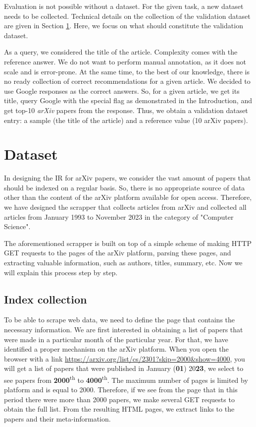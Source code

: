 \documentclass{article}
\begin{document}
        Evaluation is not possible without a dataset. For the given task, a new dataset needs to be collected. Technical details on the collection of the validation dataset are given in Section \ref{sec:dataset}. Here, we focus on what should constitute the validation dataset.

        As a query, we considered the title of the article. Complexity comes with the reference answer. We do not want to perform manual annotation, as it does not scale and is error-prone. At the same time, to the best of our knowledge, there is no ready collection of correct recommendations for a given article. We decided to use Google responses as the correct answers. So, for a given article, we get its title, query Google with the special flag as demonstrated in the Introduction, and get top-10 \textit{arXiv} papers from the response. Thus, we obtain a validation dataset entry: a sample (the title of the article) and a reference value (10 arXiv papers). 

\section{Dataset}\label{sec:dataset}
    
    In designing the IR for arXiv papers, we consider the vast amount of papers that should be indexed on a regular basis. So, there is no appropriate source of data other than the content of the arXiv platform available for open access. Therefore, we have designed the scrapper that collects articles from arXiv and collected all articles from January 1993 to November 2023 in the category of "Computer Science".

    The aforementioned scrapper is built on top of a simple scheme of making HTTP GET requests to the pages of the arXiv platform, parsing these pages, and extracting valuable information, such as authors, titles, summary, etc. Now we will explain this process step by step.

    \subsection{Index collection}

        To be able to scrape web data, we need to define the page that contains the necessary information. We are first interested in obtaining a list of papers that were made in a particular month of the particular year. For that, we have identified a proper mechanism on the arXiv platform. When you open the browser with a link \url{https://arxiv.org/list/cs/2301?skip=2000&show=4000}, you will get a list of papers that were published in January (\textbf{01}) 20\textbf{23}, we select to see papers from \textbf{2000}\textsuperscript{th} to \textbf{4000}\textsuperscript{th}. The maximum number of pages is limited by platform and is equal to 2000. Therefore, if we see from the page that in this period there were more than 2000 papers, we make several GET requests to obtain the full list. From the resulting HTML pages, we extract links to the papers and their meta-information. 
        
\end{document}
